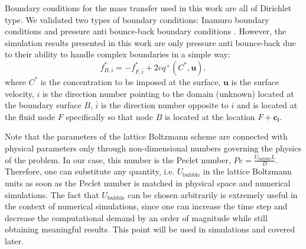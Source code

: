 \documentclass{article}
\newcommand{\beq}{\begin{equation}}
\newcommand{\feq}{\end{equation}}
\newcommand{\ububble}{U_{\mathrm{bubble}}}
\newcommand{\cstar}{C^{*}}
\begin{document}

Boundary conditions for the mass transfer used in this work are all of Dirichlet type. We validated
two types of boundary conditions: Inamuro boundary conditions \cite{inamuro-scalar-boundary} and
pressure anti bounce-back boundary conditions \cite{ginzburg-multireflection}. However, the
simulation results presented in this work are only pressure anti bounce-back due to their ability
to handle complex boundaries in a simple way:
\beq
\label{antibb}
f^{*}_{B,i}=-f^{*}_{F,\bar{i}} + 2 eq^+(\cstar,\bm{u}),
\feq
where $\cstar$ is the concentration to be imposed at the surface, $\bm{u}$ is the surface velocity,
$i$ is the direction number pointing to the domain (unknown) located at the boundary surface $B$,
$\bar{i}$ is the direction number opposite to $i$ and is located at the fluid node $F$ specifically
so that node $B$ is located at the location $F+\bm{c_i}$. 

Note that the parameters of the lattice
Boltzmann scheme are connected with  physical parameters only through  non-dimensional
numbers governing the physics of the problem. In our case, this number is the Peclet number, $Pe=\frac{\ububble L}{D}$.
Therefore, one can substitute any quantity, i.e.
$\ububble$ in the lattice Boltzmann units as soon as the
Peclet number is  matched in physical space and numerical simulations. The fact that $\ububble$
can be chosen arbitrarily is extremely useful in the context of numerical simulations, since one can
increase the time step and decrease the computational demand by an order of magnitude while still
obtaining meaningful results. This point will be used in simulations and covered later. 
\end{document}
